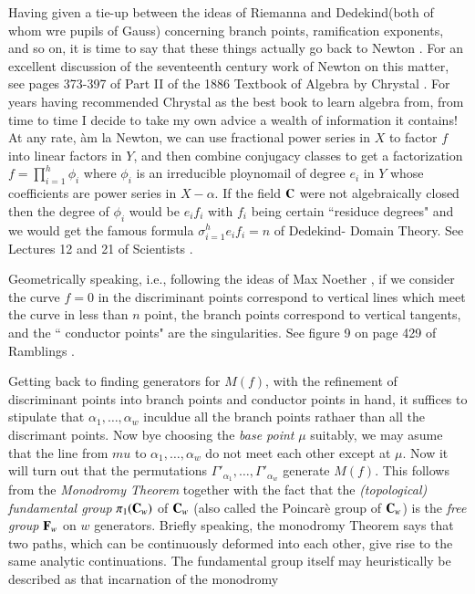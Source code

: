 Having given a tie-up between the ideas of Riemanna and Dedekind(both of whom wre pupils of Gauss) concerning branch points, ramification exponents, and so on, it is time to say that these things actually go back to Newton \cite{art1-key47}. For an excellent discussion of the seventeenth century work of Newton on this matter, see pages 373-397 of Part II of the 1886 Textbook of Algebra by Chrystal \cite{art1-key27}. For years having recommended Chrystal as the best book to learn algebra from, from time to time I decide to take my own advice a wealth of information it contains! At any rate, \`am la Newton, we can use fractional power series in $X$ to factor $f$ into linear factors in $Y$, and then combine conjugacy classes to get a factorization $f= \prod^{h}_{i=1} \phi_{i}$ where $\phi_{i}$ is an irreducible ploynomail of degree $e_{i}$ in $Y$ whose coefficients are power series in $X-\alpha$. If the field $\mathbf{C}$ were not algebraically closed then the degree of $\phi_{i}$ would be $e_{i}f_{i}$ with $f_{i}$ being certain ``residuce degrees" and we would get the famous formula $\sigma^{h}_{i=1} e_{i}f_{i}=n$ of Dedekind- Domain Theory. See Lectures 12 and 21 of Scientists \cite{art1-key6}.

Geometrically speaking, i.e., following the ideas of Max Noether \cite{art1-key48}, if we consider the curve $f=0$ in the discriminant points correspond to vertical lines which meet the curve in less than $n$ point, the branch points correspond to vertical tangents, and the `` conductor points" are the singularities. See figure 9 on page 429 of Ramblings \cite{art1-key5}.

 Getting back to finding generators for $M(f)$, with the refinement of discriminant points into branch points and conductor points in hand, it suffices to stipulate that $\alpha_{1}, \ldots, \alpha_{w}$ inculdue all the branch points rathaer than all the discrimant points. Now bye choosing the \textit{base point} $\mu$ suitably, we may asume that the line from $mu$ to $\alpha_{1}, \ldots, \alpha_{w}$ do not meet each other except at $\mu$.  Now it will turn out that the permutations $\Gamma'_{\alpha_{1}}, \ldots, \Gamma'_{\alpha_{w}}$ generate $M(f)$. This follows from the
\textit{Monodromy Theorem} together with the fact that the \textit{(topological) fundamental group} $\pi_{1}(\mathbf{C}_{w})$ of $\mathbf{C}_{w}$ (also called the Poincar\`e group of $\mathbf{C}_{w}$) is the \textit{free group} $\mathbf{F}_{w}$ on $w$ generators. Briefly speaking, the monodromy Theorem says that two paths, which can be continuously deformed into each other, give rise to the same analytic continuations. The fundamental group itself may heuristically be described as that incarnation of the monodromy


